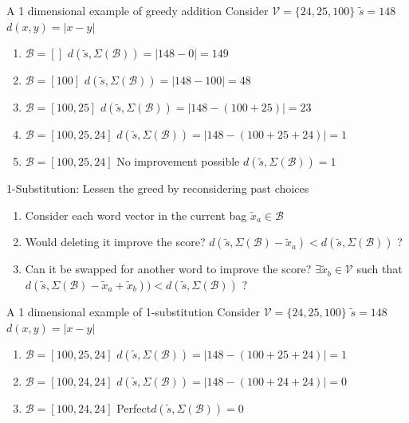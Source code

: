 \documentclass[]{beamer}
\newcommand{\s}{\tilde{s}}
\newcommand{\x}{\tilde{x}}
\newcommand{\V}{\mathcal{V}}
\newcommand{\B}{\mathcal{B}}
\begin{document}
\begin{frame}{A 1 dimensional example of greedy addition}
	\vectorselectionproblemdefnalt
	\vfill
	Consider $\V=\{24,25,100\}$ \hfill $\s=148$ \hfill $d(x,y)=|x-y|$
	\begin{enumerate}
		\item<1-> $\B=[]$ \hfill $d(\s,\Sigma(\B))=|148-0|=149$ 
		\item<2-> $\B=[100]$ \hfill $d(\s,\Sigma(\B))=|148-100|=48$ 
		\item<3-> $\B=[100,25]$ \hfill $d(\s,\Sigma(\B))=|148-(100+25)|=23$ 
		\item<4-> $\B=[100,25,24]$ \hfill $d(\s,\Sigma(\B))=|148-(100+25+24)|=1$ 
		\item<5-> $\B=[100,25,24]$ \hfill No improvement possible \hfill $d(\s,\Sigma(\B))=1$ 
	\end{enumerate}
	\vfill
	\vfill
\end{frame}

\begin{frame}{1-Substitution: Lessen the greed by reconsidering past choices}
	\vectorselectionproblemdefnalt
	\vfill
	\begin{enumerate}
		\item Consider each word vector in the current bag $\x_a\in\B$
		\item Would deleting it improve the score? $d(\s,\Sigma(\B)-\x_a)<d(\s,\Sigma(\B))$ ?
		\item Can it be swapped for another word to improve the score?
		$\exists \x_b\in\V$ such that
		$d(\s,\Sigma(\B)-\x_a+\x_b))<d(\s,\Sigma(\B))$ ?
	\end{enumerate}
\end{frame}

\begin{frame}{A 1 dimensional example of 1-substitution}
	\vectorselectionproblemdefnalt
	\vfill
	Consider $\V=\{24,25,100\}$ \hfill $\s=148$ \hfill $d(x,y)=|x-y|$
	\begin{enumerate}
		\item<1-> $\B=[100,25,24]$ \hfill $d(\s,\Sigma(\B))=|148-(100+25+24)|=1$ 
		\item<2-> $\B=[100,24,24]$ \hfill $d(\s,\Sigma(\B))=|148-(100+24+24)|=0$ 
		\item<3-> $\B=[100,24,24]$ \hfill Perfect\hfill $d(\s,\Sigma(\B))=0$ 
	\end{enumerate}
	\vfill
	\vfill
\end{frame}
\end{document}
